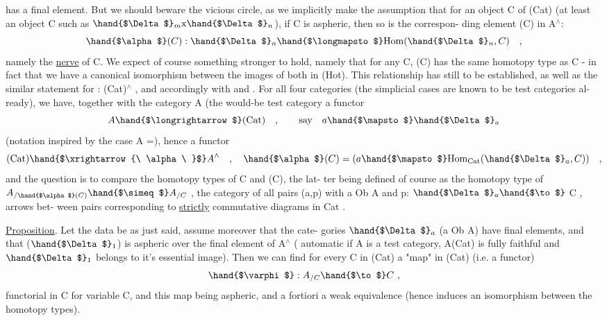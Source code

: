 has a final element.  But we should beware the vicious circle, as we
implicitly make the assumption that for an object C of (Cat)  (at least
an object C such as $\hand{$\Delta$}_{m}\mathrm{x}\hand{$\Delta$}_{n}$), if C is aspheric,  then so is the correspon-%
ding   element \hand{$\alpha$}(C) in A$^\wedge$:
\[ \hand{$\alpha$}(C) : \hand{$\Delta$}_{n} \hand{$\longmapsto$} \mathrm{Hom}(\hand{$\Delta$}_{n},C) \quad , \]
namely the \uline{nerve} of C.  We expect of course something stronger to hold,
namely that for any C, \hand{$\alpha$}(C) has the same homotopy type as C  -  in fact
that we have a canonical isomorphism between the images of both in (Hot).
This relationship has still to be established,  as well as the similar
statement for \hand{$\beta$} : (Cat)\hand{$\to$}\hand{$\square$}$^\wedge$ , and accordingly with \hand{$\widetilde{\Delta}$} and \hand{$\widetilde{\square}$} .  For all
four categories (the simplicial cases are known to be test categories al-%
ready),  we have,  together with the category A (the would-be test category\hand{),}
a functor
\[ A \hand{$\longrightarrow$} (\mathrm{Cat}) \quad , \qquad \text{say} \quad a \hand{$\mapsto$} \hand{$\Delta$}_{a} \]
(notation inspired by the case A =\hand{$\Delta$}),  hence a functor
\[ (\mathrm{Cat}) \hand{$\xrightarrow{\ \alpha\ }$} A^\wedge \quad , \quad \hand{$\alpha$}(C) = (a \hand{$\mapsto$} \mathrm{Hom}_{\mathrm{Cat}}(\hand{$\Delta$}_{a},C)) \quad , \]
and the question is to compare the homotopy types of C and \hand{$\alpha$}(C),  the lat-%
ter being defined of course as the homotopy type of $A_{/\hand{$\alpha$}(C)} \hand{$\simeq$} A_{/C}$ ,
the category of all pairs  (a,p) with a \hand{$\in$}Ob A and p: $\hand{$\Delta$}_{a}\hand{$\to$}$ C ,  arrows bet-%
ween pairs corresponding to \uline{strictly} commutative diagrams  in Cat
.

\uline{Proposition}.  Let the data be as just said,  assume moreover that the cate-%
gories $\hand{$\Delta$}_{a}$ (a \hand{$\in$} Ob A) have final elements,  and that \hand{$\alpha$}($\hand{$\Delta$}_{1}$) is aspheric
over the final element of A$^\wedge$  ( automatic if A is a test category,
A\hand{$\longrightarrow$}(Cat) is fully faithful and $\hand{$\Delta$}_{1}$ belongs to it's essential image). Then
we can find for every C in (Cat) a  "map" in (Cat) (i.e. a functor)
\margin{(*)} \[ \hand{$\varphi$} : A_{/C} \hand{$\to$} C \ , \]
functorial in C for variable C,  and this map being 
aspheric,  and a fortiori a weak equivalence (hence induces an isomorphism
between the homotopy types).

